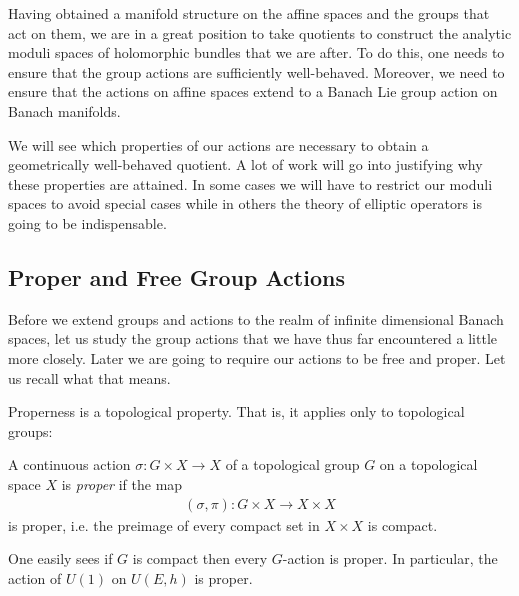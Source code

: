 \documentclass[12pt]{ociamthesis}  %
\begin{document}
Having obtained a manifold structure on the affine spaces and the groups
that act on them, we are in a great position to take quotients to construct
the analytic moduli spaces of holomorphic bundles that we are after. To do this,
one needs to ensure that the group actions are sufficiently well-behaved. Moreover,
we need to ensure that the actions on affine spaces extend to a Banach Lie group
action on Banach manifolds.

We will see which properties of our actions are necessary to
obtain a geometrically well-behaved quotient. A lot of work will go into justifying why
these properties are attained. In some cases we will have to
restrict our moduli spaces to avoid special cases while in others
the theory of elliptic operators is going to be indispensable.

\subsection{Proper and Free Group Actions}

Before we extend groups and actions to the realm of infinite dimensional
Banach spaces, let us study the group actions that we have thus
far encountered a little more closely. Later we are going to require our
actions to be free and proper. Let us recall what that means.

Properness is a topological property. That is, it applies only to
topological groups:

\begin{definition}
  A continuous action $\sigma : G\times X\to X$ of a topological group $G$
  on a topological space $X$ is \emph{proper} if the map
  \begin{align}\label{eq:proper_map}
    (\sigma,\pi) : G\times X \to X\times X
  \end{align}
  is proper, i.e. the preimage of every compact set in $X\times X$
  is compact.
\end{definition}

\begin{example}
  One easily sees if $G$ is compact then every $G$-action is proper.
  In particular, the action of $U(1)$ on $U(E,h)$ is
  proper.
\end{example}
\end{document}
